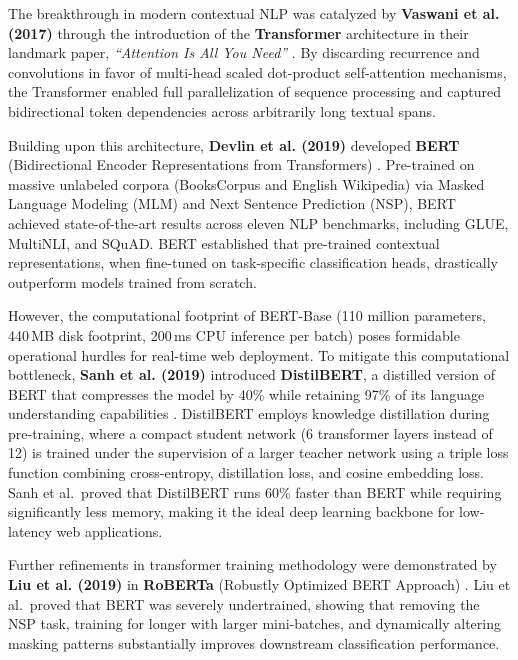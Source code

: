 The breakthrough in modern contextual NLP was catalyzed by \textbf{Vaswani et al. (2017)} through the introduction of the \textbf{Transformer} architecture in their landmark paper, \textit{``Attention Is All You Need''} \cite{vaswani2017attention}. By discarding recurrence and convolutions in favor of multi-head scaled dot-product self-attention mechanisms, the Transformer enabled full parallelization of sequence processing and captured bidirectional token dependencies across arbitrarily long textual spans.

Building upon this architecture, \textbf{Devlin et al. (2019)} developed \textbf{BERT} (Bidirectional Encoder Representations from Transformers) \cite{devlin2019bert}. Pre-trained on massive unlabeled corpora (BooksCorpus and English Wikipedia) via Masked Language Modeling (MLM) and Next Sentence Prediction (NSP), BERT achieved state-of-the-art results across eleven NLP benchmarks, including GLUE, MultiNLI, and SQuAD. BERT established that pre-trained contextual representations, when fine-tuned on task-specific classification heads, drastically outperform models trained from scratch.

However, the computational footprint of BERT-Base (110 million parameters, 440\,MB disk footprint, 200\,ms CPU inference per batch) poses formidable operational hurdles for real-time web deployment. To mitigate this computational bottleneck, \textbf{Sanh et al. (2019)} introduced \textbf{DistilBERT}, a distilled version of BERT that compresses the model by 40\% while retaining 97\% of its language understanding capabilities \cite{sanh2019distilbert}. DistilBERT employs knowledge distillation during pre-training, where a compact student network (6 transformer layers instead of 12) is trained under the supervision of a larger teacher network using a triple loss function combining cross-entropy, distillation loss, and cosine embedding loss. Sanh et al.\ proved that DistilBERT runs 60\% faster than BERT while requiring significantly less memory, making it the ideal deep learning backbone for low-latency web applications.

Further refinements in transformer training methodology were demonstrated by \textbf{Liu et al. (2019)} in \textbf{RoBERTa} (Robustly Optimized BERT Approach) \cite{liu2019roberta}. Liu et al.\ proved that BERT was severely undertrained, showing that removing the NSP task, training for longer with larger mini-batches, and dynamically altering masking patterns substantially improves downstream classification performance.

